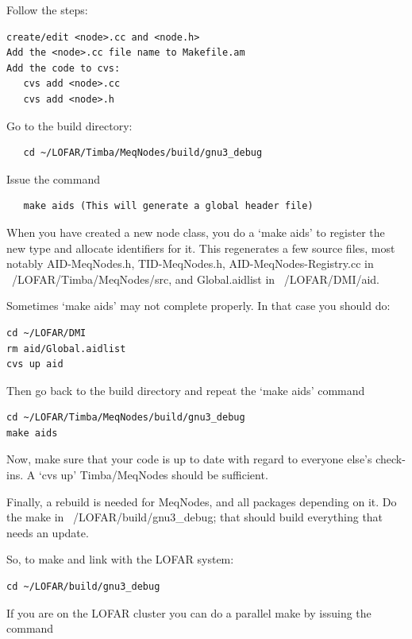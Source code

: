 \documentclass[10pt]{article}
\begin{document}
Follow the steps:

\begin{verbatim}
create/edit <node>.cc and <node.h>
Add the <node>.cc file name to Makefile.am
Add the code to cvs:
   cvs add <node>.cc
   cvs add <node>.h
\end{verbatim}

Go to the build directory:
\begin{verbatim}
   cd ~/LOFAR/Timba/MeqNodes/build/gnu3_debug
\end{verbatim}

Issue the command

\begin{verbatim}
   make aids (This will generate a global header file)
\end{verbatim}

When you have created a new node class, you do a `make aids' to 
register the new type and allocate identifiers for
it. This regenerates a few source files, most notably
AID-MeqNodes.h, TID-MeqNodes.h, AID-MeqNodes-Registry.cc 
in ~/LOFAR/Timba/MeqNodes/src, and Global.aidlist in
~/LOFAR/DMI/aid. 

Sometimes `make aids' may not complete properly. In that case you
should do:

\begin{verbatim}
cd ~/LOFAR/DMI
rm aid/Global.aidlist
cvs up aid
\end{verbatim}

Then go back to the build directory and repeat the `make aids' command

\begin{verbatim}
cd ~/LOFAR/Timba/MeqNodes/build/gnu3_debug
make aids
\end{verbatim}

Now, make sure that your code is up to date with regard to everyone 
else's check-ins.  A `cvs up' Timba/MeqNodes should be sufficient.

Finally, a rebuild is needed for MeqNodes, and all packages 
depending on it. Do the make in ~/LOFAR/build/gnu3\_debug; that 
should build everything that needs an update.

So, to make and link with the LOFAR system:

\begin{verbatim}
cd ~/LOFAR/build/gnu3_debug
\end{verbatim}

If you are on the LOFAR cluster you can do a parallel make by
issuing the command
\end{document}
